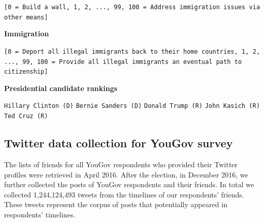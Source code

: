 \documentclass[
  12pt,
]{article}
\begin{document}
\noindent\texttt{[0 = Build a wall, 1, 2, ..., 99, 100 = Address immigration issues via other means]}\vspace{4mm}\newline

\textbf{Immigration}

\newline

\noindent\texttt{[0 = Deport all illegal immigrants back to their home countries, 1, 2, ..., 99, 100 = Provide all illegal immigrants an eventual path to citizenship]}\vspace{4mm}\newline

\textbf{Presidential candidate rankings}

\newline

\noindent\texttt{Hillary Clinton (D)}\newline
\noindent\texttt{Bernie Sanders (D)}\newline
\noindent\texttt{Donald Trump (R)}\newline
\noindent\texttt{John Kasich (R)}\newline
\noindent\texttt{Ted Cruz (R)}\newline

\clearpage

\hypertarget{twitter-data-collection-for-yougov-survey}{%
\subsection{Twitter data collection for YouGov survey}\label{twitter-data-collection-for-yougov-survey}}

The lists of friends for all YouGov respondents who provided their Twitter profiles were retrieved in April 2016. After the election, in December 2016, we further collected the posts of YouGov respondents and their friends. In total we collected 1,244,124,493 tweets from the timelines of our respondents' friends. These tweets represent the corpus of posts that potentially appeared in respondents' timelines.
\end{document}
